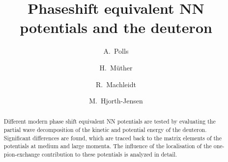 
\draft
\title{Phaseshift equivalent NN potentials and the deuteron}
\author{A.\ Polls}
\address{Departament d'Estructura i Costituents de la Mat\`eria,
         Universitat de Barcelona, E-08028 Barcelona, Spain}
\author{H.\ M\"{u}ther}
\address{Institut f\"ur Theoretische Physik, Universit\"at T\"ubingen,
         D-72076 T\"ubingen, Germany}
\author{R.\ Machleidt}
\address{Department of Physics, University of Idaho, Moscow,
         ID 83843, U.S.A.}
\author{M.\ Hjorth-Jensen}
\address{Nordita, Blegdamsvej 17, DK-2100 K\o benhavn \O, Denmark}
\maketitle
\begin{abstract}
Different modern phase shift equivalent NN potentials are tested by evaluating
the partial wave decomposition of the kinetic and potential energy of the
deuteron. Significant differences are found, which are traced back to the 
matrix elements of the potentials at medium and large momenta. The influence of
the localisation of the one-pion-exchange contribution to these potentials is
analyzed in detail.
\end{abstract}


